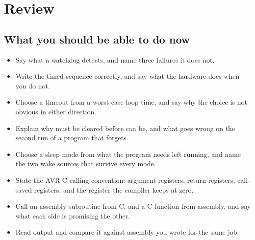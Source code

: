 
\section{Review}
\label{c6:sec:review}

\subsection*{What you should be able to do now}
\begin{itemize}
  \item Say what a watchdog detects, and name three failures it does not.
  \item Write the timed sequence correctly, and say what the hardware does when you do not.
  \item Choose a timeout from a worst-case loop time, and say why the choice is not obvious in
    either direction.
  \item Explain why  must be cleared before  can be, and what goes wrong on the
    second run of a program that forgets.
  \item Choose a sleep mode from what the program needs left running, and name the two wake sources
    that survive every mode.
  \item State the AVR C calling convention: argument registers, return registers, call-saved
    registers, and the register the compiler keeps at zero.
  \item Call an assembly subroutine from C, and a C function from assembly, and say what each side
    is promising the other.
  \item Read  output and compare it against assembly you wrote for the same job.
\end{itemize}

